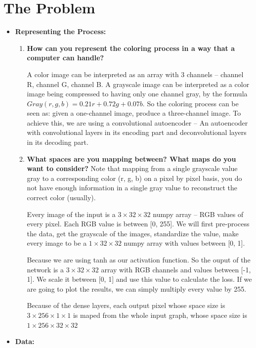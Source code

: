 \documentclass[letter]{article}
\begin{document}
\section{The Problem}
\label{sec:The Problem}
\begin{itemize}
	\item {\textbf{Representing the Process:}   } 
	\begin{enumerate}
		\item {\textbf{How can you represent the coloring process in a way that a computer can handle?}}
		\par{A color image can be interpreted as an array with 3 channels -- channel R,  channel G, channel B. A grayscale image can be interpreted as a color image being compressed to having only one channel gray, by the formula $ Gray(r, g, b) = 0.21r + 0.72g + 0.07b $. So the coloring process can be seen as: given a one-channel image, produce a three-channel image. To achieve this, we are using a convolutional autoencoder -- An autoencoder with convolutional layers in its encoding part and deconvolutional layers in its decoding part.}
		\item {\textbf{What spaces are you mapping between? What maps do you want to consider?} Note that mapping
			from a single grayscale value gray to a corresponding color (r, g, b) on a pixel by pixel basis, you do not have
			enough information in a single gray value to reconstruct the correct color (usually).}
		\par{Every image of the input is a $ 3 \times 32 \times 32 $ numpy array -- RGB values of every pixel. Each RGB value is between [0, 255]. We will first pre-process the data, get the grayscale of the images, standardize the value, make every image to be a $ 1 \times 32 \times 32 $ numpy array with values between [0, 1]. }
		\par{Because we are using tanh as our activation function. So the ouput of the network is a $ 3 \times 32 \times 32 $ array with RGB channels and values between [-1, 1]. We scale it between [0, 1] and use this value to calculate the loss. If we are going to plot the results, we can simply multiply every value by 255.}
		\par{Because of the dense layers, each output pixel whose space size is $ 3 \times 256 \times 1 \times 1 $ is maped from the whole input graph, whose space size is $ 1 \times 256 \times 32 \times 32 $}
	\end{enumerate}
	\item {\textbf{Data:}} 
	\begin{enumerate}

\end{enumerate}
\end{itemize}
\end{document}
